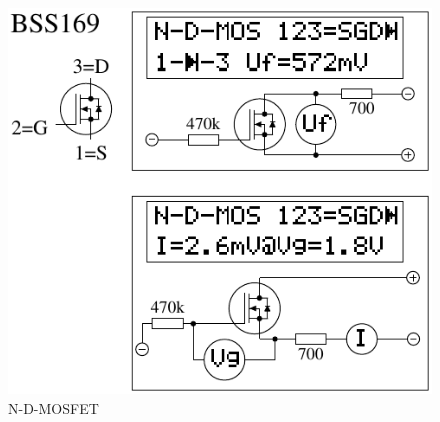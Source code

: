 \begin{figure}[H]
\centering
\includegraphics[]{../FIG/MOS_BSS169.pdf}
\caption{N-D-MOSFET}
\label{fig:MOS-N-D}
\end{figure}

